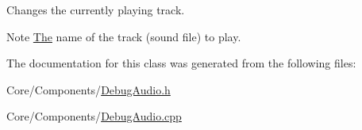 Changes the currently playing track. 

\begin{DoxyNote}{Note}
\hyperlink{classThe}{The} name of the track (sound file) to play. 
\end{DoxyNote}


The documentation for this class was generated from the following files\-:\begin{DoxyCompactItemize}
\item 
Core/\-Components/\hyperlink{DebugAudio_8h}{Debug\-Audio.\-h}\item 
Core/\-Components/\hyperlink{DebugAudio_8cpp}{Debug\-Audio.\-cpp}\end{DoxyCompactItemize}
